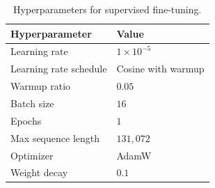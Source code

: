 \begin{table}[ht]
\centering
\caption{Hyperparameters for supervised fine-tuning.}
\label{tab:sft_hyperparams}
\begin{tabular}{ll}
\toprule
\textbf{Hyperparameter} & \textbf{Value} \\
\midrule
Learning rate & $1 \times 10^{-5}$ \\
Learning rate schedule & Cosine with warmup \\
Warmup ratio & $0.05$ \\
Batch size & $16$ \\
Epochs & $1$ \\
Max sequence length & $131{,}072$ \\
Optimizer & AdamW \\
Weight decay & $0.1$ \\
\bottomrule
\end{tabular}
\end{table}